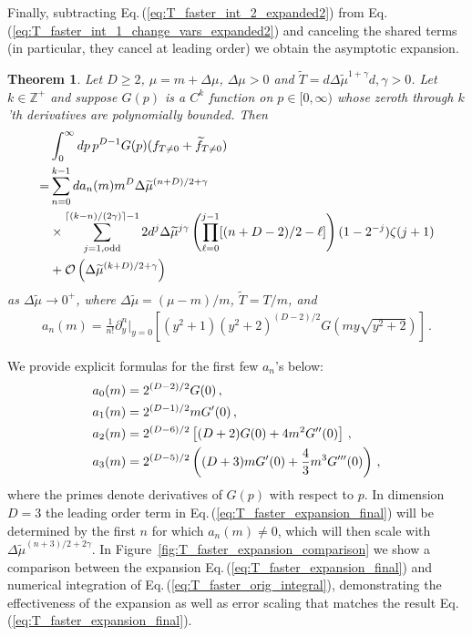 \documentclass[sn-mathphys,Numbered]{sn-jnl}
\newcommand{\req}[1]{Eq.\,(\ref{#1})}
\newcommand{\rf}[1]{Figure~{\ref{#1}}}
\newtheorem{theorem}{Theorem}
\begin{document}
Finally, subtracting \req{eq:T_faster_int_2_expanded2} from \req{eq:T_faster_int_1_change_vars_expanded2} and canceling the shared terms (in particular, they cancel at leading order) we obtain the asymptotic expansion.

\begin{theorem}\label{thms:T_decay_faster}
Let $D\geq 2$, $\mu=m+\Delta\mu$, $\Delta\mu>0$ and $\widetilde{T}=d\Delta\widetilde{\mu}^{1+\gamma}$$d,\gamma>0$. Let $k\in\mathbb{Z}^+$ and suppose $G(p)$ is a $C^k$ function on $p\in[0,\infty)$ whose zeroth through $k$'th derivatives are polynomially bounded. Then
\begin{align}
 &\int_0^\infty dp\, p^{D-1} G(p)(f_{T\neq 0}+\widetilde{f}_{T\neq 0})\label{eq:T_faster_orig_integral}\\
 =& \sum_{n=0}^{k-1} da_n(m)m^{D}\Delta\widetilde{\mu}^{(n+D)/2+\gamma}\label{eq:T_faster_expansion_final}\\
 &\times\sum_{j=1,\mathrm{odd}}^{\lceil(k-n)/(2\gamma)\rceil-1}
 2d^j\Delta\widetilde{\mu}^{j\gamma}\left(\prod_{\ell=0}^{j-1}[(n+D-2)/2-\ell] \right)(1-2^{-j})\zeta(j+1) \notag\\
 &+\mathcal{O}\left(\Delta\widetilde{\mu}^{(k+D)/2+\gamma}\right)\notag
\end{align} 
as $\Delta\widetilde{\mu}\to 0^+$, where $\Delta\widetilde{\mu}=(\mu-m)/m$, $\widetilde{T}=T/m$, and
\begin{align}\label{eq:an_def}
a_n(m)=\frac{1}{n!}\partial_y^n|_{y=0}\left[ (y^2+1)( y^2+2)^{(D-2)/2} G\left(my\sqrt{y^2+2}\right)\right]\,.
\end{align}
\end{theorem}
We provide explicit formulas for the first few $a_n$'s below:
\begin{align}\label{eq:first_few_a_ns}
 &a_0(m)=2^{(D-2)/2} G(0)\,,\\
 &a_1(m)=2^{(D-1)/2}mG^\prime(0)\,,\notag\\
 &a_2(m)=2^{(D-6)/2}\left[(D+2)G(0)+4m^2 G^{\prime\prime}(0)\right]\,,\notag\\
 &a_3(m)=2^{(D - 5)/2} \left((D + 3) m G^\prime(0) + \frac{4}{3}m^3 G^{\prime\prime\prime}(0) \right)\,,\notag
\end{align}
where the primes denote derivatives of $G(p)$ with respect to $p$. In dimension $D=3$ the leading order term in \req{eq:T_faster_expansion_final} will be determined by the first $n$ for which $a_n(m)\neq 0$, which will then scale with $\Delta\widetilde{\mu}^{(n+3)/2+2\gamma}$. In \rf{fig:T_faster_expansion_comparison} we show a comparison between the expansion \req{eq:T_faster_expansion_final} and numerical integration of \req{eq:T_faster_orig_integral}, demonstrating the effectiveness of the expansion as well as error scaling that matches the result \req{eq:T_faster_expansion_final}.
\end{document}
